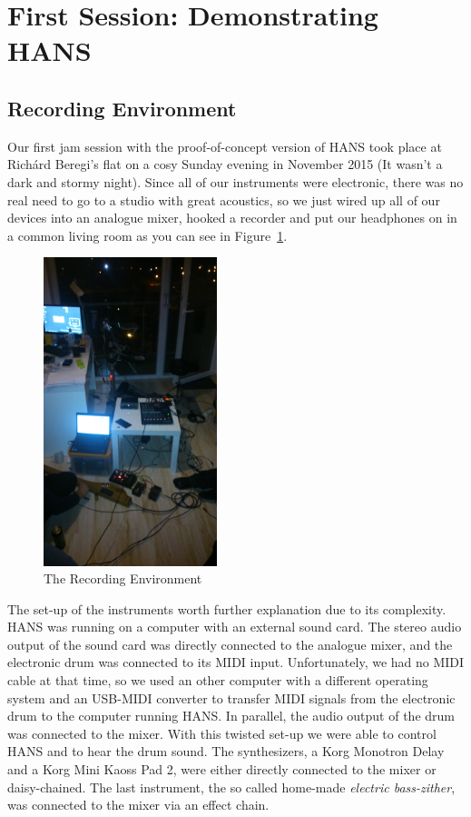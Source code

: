\documentclass[12pt,a4paper,oneside]{report}
\begin{document}
\section*{First Session: Demonstrating HANS}

\subsection*{Recording Environment}
Our first jam session with the proof-of-concept version of HANS took
place at Richárd Beregi's flat on a cosy Sunday evening in November
2015 (It wasn't a dark and stormy night). Since all of our instruments were electronic, there was no real
need to go to a studio with great acoustics, so we just wired up all of
our devices into an analogue mixer, hooked a recorder and put our
headphones on in a common living room as you can see in
Figure~\ref{fig:rec_env}.

\begin{figure}[h!]
\centering
\includegraphics[width=0.45\textwidth]{DSC_0402.jpg}
\caption{The Recording Environment}
\label{fig:rec_env}
\end{figure}

The set-up of the instruments worth further explanation due to its
complexity. HANS was running on a computer with an external sound
card. The stereo audio output of the sound card was directly connected
to the analogue mixer, and the electronic drum was connected to its
MIDI input. Unfortunately, we had no MIDI cable at that time, so we
used an other computer with a different operating system and an
USB-MIDI converter to transfer MIDI signals from the electronic drum
to the computer running HANS. In parallel, the audio output of the
drum was connected to the mixer. With this twisted set-up we were able
to control HANS and to hear the drum sound. The synthesizers, a Korg
Monotron Delay and a Korg Mini Kaoss Pad 2, were either directly
connected to the mixer or daisy-chained. The last instrument, the so
called home-made \emph{electric bass-zither}, was connected to the
mixer via an effect chain.
\end{document}

